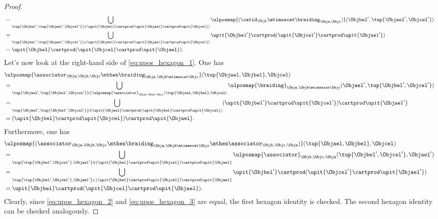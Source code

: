 \begin{proof}
\begin{equation}
\begin{aligned}
			 & =\bigcup_{\tup{\Objbel',\tup{\Objael',\Objcel'}}\in \upit\{\Objbel\} \cartprod (\upit \{\Objael\}\cartprod \upit\{ \Objcel\})} \ulposmap{(\catid_{\Objb}\mtimescat \braiding_{\Obja,\Objc})}(\Objbel',\tup{\Objael',\Objcel'}) \\
			 & =\bigcup_{\tup{\Objbel',\tup{\Objael',\Objcel'}}\in \upit\{\Objbel\} \cartprod (\upit \{\Objael\}\cartprod \upit\{ \Objcel\})} \upit\{\Objbel'\}\cartprod (\upit\{\Objcel'\}\cartprod \upit\{\Objael'\})                       \\
			 & =\upit\{\Objbel\} \cartprod (\upit \{\Objcel\}\cartprod \upit\{ \Objael\}).
		\end{aligned}
	\end{equation}
	Let's now look at the right-hand side of \cref{eq:upos_hexagon_1}.
	One has
	\begin{equation*}
		\begin{aligned}
			 & \ulposmap{\associator_{\Obja,\Objb,\Objc} \mthen \braiding_{\Obja,\Objb\mtimescat \Objc}}(\tup{\Objael,\Objbel},\Objcel)                                                                                          \\
			 & =\bigcup_{\tup{\Objael',\tup{\Objbel',\Objcel'}}\in \ulposmap{\associator}_{\Obja,\Objb,\Objc}(\tup{\Objael,\Objbel},\Objcel)}\ulposmap{\braiding}_{\Obja,\Objb\mtimescat\Objc}(\Objael',\tup{\Objbel',\Objcel'}) \\
			 & =\bigcup_{\tup{\Objael',\tup{\Objbel',\Objcel'}}\in \upit\{\Objael\} \cartprod (\upit \{ \Objbel\}\cartprod \upit\{ \Objcel\})} (\upit\{\Objbel'\} \cartprod \upit \{ \Objcel'\})\cartprod \upit\{ \Objael'\}     \\
			 & =(\upit\{\Objbel\} \cartprod \upit \{ \Objcel\})\cartprod \upit\{ \Objael\}.
		\end{aligned}
	\end{equation*}
	Furthermore, one has
	\begin{equation}
		\label{eq:upos_hexagon_3}
		\begin{aligned}
			 & \ulposmap{(\associator_{\Obja,\Objb,\Objc} \mthen \braiding_{\Obja,\Objb\mtimescat \Objc}\mthen \associator_{\Objb,\Objc,\Obja})}(\tup{\Objael,\Objbel},\Objcel)                                            \\
			 & =\bigcup_{\tup{\tup{\Objbel',\Objcel'},\Objael'}\in (\upit\{\Objbel\} \cartprod \upit \{ \Objcel\})\cartprod \upit\{ \Objael\}}\ulposmap{\associator}_{\Objb,\Objc,\Obja}(\tup{\Objbel',\Objcel'},\Objael') \\
			 & =\bigcup_{\tup{\tup{\Objbel',\Objcel'},\Objael'}\in (\upit\{\Objbel\} \cartprod \upit \{ \Objcel\})\cartprod \upit\{ \Objael\}}\upit\{\Objbel'\}\cartprod (\upit\{\Objcel'\}\cartprod \upit\{\Objael'\})    \\
			 & =\upit\{\Objbel\} \cartprod (\upit \{\Objcel\}\cartprod \upit\{ \Objael\}).
		\end{aligned}
	\end{equation}
	Clearly, since \cref{eq:upos_hexagon_2} and \cref{eq:upos_hexagon_3} are equal, the first hexagon identity is checked.
	The second hexagon identity can be checked analogously.
\end{proof}

